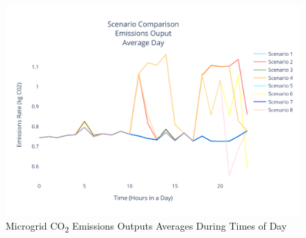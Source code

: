 \documentclass[conference]{IEEEtran}
\begin{document}
	\begin{figure}[H]
		\centering
		\includegraphics[width=1\linewidth]{Fig/emissions_scenario_comparison}
		\caption{Microgrid  CO\textsubscript{2} Emissions Outputs Averages During Times of Day}
		\label{fig:emissionsscenariocomparison}
	\end{figure}
\end{document}
